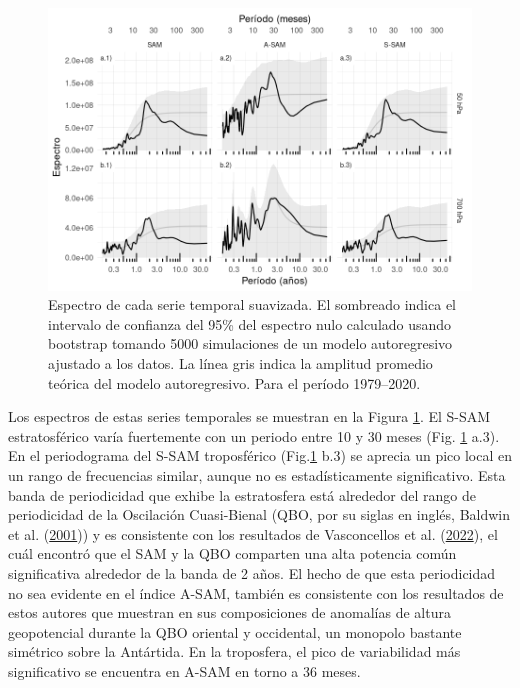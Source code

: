 \documentclass[12pt,oneside,a4paper]{reedthesis}
\begin{document}
\begin{figure}

{\centering \includegraphics{figures/30-sam/spectrum-1} 

}

\caption{Espectro de cada serie temporal suavizada. El sombreado indica el intervalo de confianza del 95\% del espectro nulo calculado usando bootstrap tomando 5000 simulaciones de un modelo autoregresivo ajustado a los datos. La línea gris indica la amplitud promedio teórica del modelo autoregresivo. Para el período 1979--2020.}\label{fig:spectrum}
\end{figure}

Los espectros de estas series temporales se muestran en la Figura \ref{fig:spectrum}.
El S-SAM estratosférico varía fuertemente con un periodo entre 10 y 30 meses (Fig. \ref{fig:spectrum} a.3).
En el periodograma del S-SAM troposférico (Fig.\ref{fig:spectrum} b.3) se aprecia un pico local en un rango de frecuencias similar, aunque no es estadísticamente significativo.
Esta banda de periodicidad que exhibe la estratosfera está alrededor del rango de periodicidad de la Oscilación Cuasi-Bienal (QBO, por su siglas en inglés, Baldwin et al. (\protect\hyperlink{ref-baldwin2001b}{2001})) y es consistente con los resultados de Vasconcellos et al. (\protect\hyperlink{ref-vasconcellos2022}{2022}), el cuál encontró que el SAM y la QBO comparten una alta potencia común significativa alrededor de la banda de 2 años.
El hecho de que esta periodicidad no sea evidente en el índice A-SAM, también es consistente con los resultados de estos autores que muestran en sus composiciones de anomalías de altura geopotencial durante la QBO oriental y occidental, un monopolo bastante simétrico sobre la Antártida.
En la troposfera, el pico de variabilidad más significativo se encuentra en A-SAM en torno a 36 meses.
\end{document}
